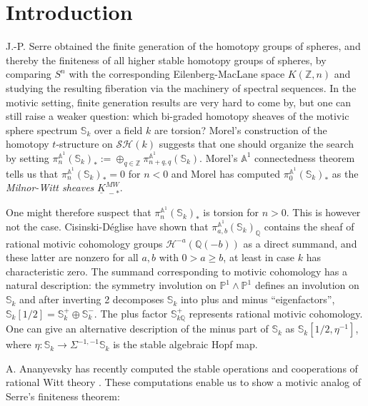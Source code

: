 \documentclass[a4paper,12pt,draft]{amsart}
\theoremstyle{definition}
\theoremstyle{remark}
\begin{document}
\tableofcontents

\section*{Introduction}

J.-P. Serre \cite{Serre} obtained the finite generation of the homotopy groups of spheres, and thereby the finiteness of all higher stable homotopy groups of spheres,  by comparing $S^n$ with the corresponding Eilenberg-MacLane space $K({{\mathbb Z}}, n)$ and studying the resulting fiberation via the machinery of spectral sequences. In the motivic setting, finite generation results are very hard to come by, but one can still raise a weaker question: which bi-graded  homotopy sheaves of the motivic sphere spectrum $\mathbb{S}_k$ over a field $k$ are torsion? Morel's construction of the  homotopy $t$-structure on ${\mathcal{SH}}(k)$ suggests that one should organize the search by setting $\pi^{{{\mathbb A}}^1}_n(\mathbb{S}_k)_*:=\oplus_{q\in{{\mathbb Z}}}\pi^{{{\mathbb A}}^1}_{n+q,q}(\mathbb{S}_k)$. Morel's ${{\mathbb A}}^1$ connectedness theorem tells us that $\pi^{{{\mathbb A}}^1}_n(\mathbb{S}_k)_*=0$ for $n<0$ and Morel has computed $\pi^{{{\mathbb A}}^1}_0(\mathbb{S}_k)_*$ as the {\em Milnor-Witt sheaves} $\underline{K}^{MW}_{\ -*}$. 

One might therefore suspect that $\pi^{{{\mathbb A}}^1}_n(\mathbb{S}_k)_*$ is torsion for $n>0$. This is however not the case. Cisinski-D\'eglise have shown that $\pi^{{{\mathbb A}}^1}_{a,b}(\mathbb{S}_k)_{{\mathbb Q}}$ contains the sheaf of rational motivic cohomology groups ${{\mathcal H}}^{-a}({{\mathbb Q}}(-b))$ as a direct summand, and these latter are nonzero for all $a, b$ with $0>a\ge b$, at least in case $k$ has characteristic zero. The summand corresponding to motivic cohomology has a natural description: the symmetry involution on ${{\mathbb P}}^1\wedge{{\mathbb P}}^1$ defines an involution on ${{\mathbb S}}_k$ and after inverting 2 decomposes ${{\mathbb S}}_k$ into plus and minus ``eigenfactors'', ${{\mathbb S}}_k[1/2]={{\mathbb S}}_k^+\oplus{{\mathbb S}}_k^-$. The plus factor  ${{\mathbb S}}_{k {{\mathbb Q}}}^+$ represents rational motivic cohomology. One can give an alternative description of the minus part of ${{\mathbb S}}_k$ as ${{\mathbb S}}_k[1/2,\eta^{-1}]$, where $\eta:{{\mathbb S}}_k\to \Sigma^{-1,-1}{{\mathbb S}}_k$ is the stable algebraic Hopf map. 

A. Ananyevsky has recently computed the stable operations and cooperations of rational Witt theory  \cite{An15}. These computations enable us to show a motivic analog of Serre's finiteness theorem:
\end{document}
